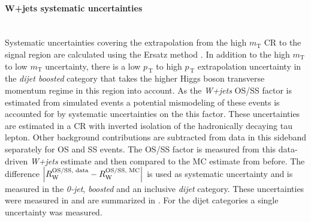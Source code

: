 \paragraph{W+jets systematic uncertainties}\mbox{}\\
Systematic uncertainties covering the extrapolation from the high $m_\text{T}$ CR to the signal region are calculated using the Ersatz method \cite{higMSSM}.
In addition to the high $m_\text{T}$ to low $m_\text{T}$ uncertainty, there is a low $p_{\,\text{T}}$ to high $p_{\,\text{T}}$ extrapolation uncertainty 
in the \textit{dijet boosted} category that takes the higher Higgs boson transverse momentum regime in this region into account.\newline{}
As the \textit{W+jets} OS/SS factor is estimated from simulated events a potential mismodeling of these events is accounted for by systematic uncertainties on the 
this factor. These uncertainties are estimated in a CR with inverted isolation of the hadronically decaying tau lepton. Other background contributions are subtracted from data in this sideband separately for OS and SS events. The OS/SS factor is measured from this data-driven \textit{W+jets} estimate and then compared
to the MC estimate from before. The difference $\left| R_\text{W}^\text{OS/SS, data}-R_\text{W}^\text{OS/SS, MC} \right|$ is used as systematic uncertainty and is measured in the \textit{0-jet}, \textit{boosted} and an inclusive \textit{dijet} category. These uncertainties were measured in \cite{danny2} and are summarized in . 
For the dijet categories a single uncertainty was measured. 
